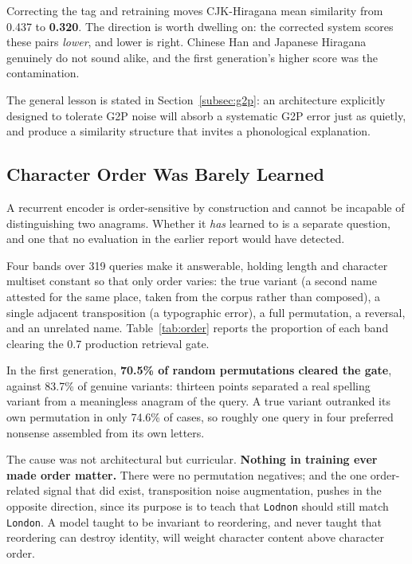 \documentclass[11pt,a4paper]{article}
\begin{document}
Correcting the tag and retraining moves CJK-Hiragana mean similarity from 0.437 to \textbf{0.320}. The direction is worth dwelling on: the corrected system scores these pairs \emph{lower}, and lower is right. Chinese Han and Japanese Hiragana genuinely do not sound alike, and the first generation's higher score was the contamination.

The general lesson is stated in Section~\ref{subsec:g2p}: an architecture explicitly designed to tolerate G2P noise will absorb a systematic G2P error just as quietly, and produce a similarity structure that invites a phonological explanation.

\subsection{Character Order Was Barely Learned}
\label{subsec:order}

A recurrent encoder is order-sensitive by construction and cannot be incapable of distinguishing two anagrams. Whether it \emph{has} learned to is a separate question, and one that no evaluation in the earlier report would have detected.

Four bands over 319 queries make it answerable, holding length and character multiset constant so that only order varies: the true variant (a second name attested for the same place, taken from the corpus rather than composed), a single adjacent transposition (a typographic error), a full permutation, a reversal, and an unrelated name. Table~\ref{tab:order} reports the proportion of each band clearing the 0.7 production retrieval gate.

In the first generation, \textbf{70.5\% of random permutations cleared the gate}, against 83.7\% of genuine variants: thirteen points separated a real spelling variant from a meaningless anagram of the query. A true variant outranked its own permutation in only 74.6\% of cases, so roughly one query in four preferred nonsense assembled from its own letters.

The cause was not architectural but curricular. \textbf{Nothing in training ever made order matter.} There were no permutation negatives; and the one order-related signal that did exist, transposition noise augmentation, pushes in the opposite direction, since its purpose is to teach that \texttt{Lodnon} should still match \texttt{London}. A model taught to be invariant to reordering, and never taught that reordering can destroy identity, will weight character content above character order.
\end{document}
